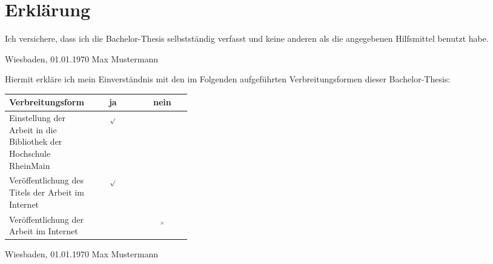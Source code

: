 \pagestyle{plain}
\chapter*{Erklärung}
Ich versichere, dass ich die Bachelor-Thesis selbstständig verfasst und keine
anderen als die angegebenen Hilfsmittel benutzt habe.

\vspace{2cm}

Wiesbaden, 01.01.1970 \hfill{} Max Mustermann

\vspace{3cm}
Hiermit erkläre ich mein Einverständnis mit den im Folgenden aufgeführten
Verbreitungsformen dieser Bachelor-Thesis:
\begin{longtable}{|p{0.35\linewidth}|c|c|}
 \hline
 \textbf{Verbreitungsform} & {\centering\textbf{~~ja~~}} & {\centering \textbf{~nein~}} \\
 \hline
 \endhead
 Einstellung der Arbeit in die Bibliothek der Hochschule RheinMain & \centering \( _{\surd } \) &\\
 \hline
 Veröffentlichung des Titels der Arbeit im Internet & \centering \( _{\surd } \) &\\
 \hline
 Veröffentlichung der Arbeit im Internet &  & { \centering \( _{\times } \) } \\
 \hline
\end{longtable}

\vspace{2cm}

Wiesbaden, 01.01.1970 \hfill{} Max Mustermann

